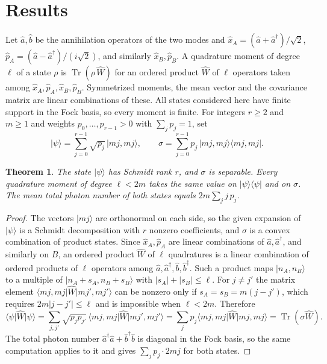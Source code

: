 \documentclass[11pt,a4paper]{article}
\newtheorem{theorem}{Theorem}
\theoremstyle{definition}
\theoremstyle{plain}
\DeclareMathOperator{\Tr}{Tr}
\newcommand{\ket}[1]{\lvert#1\rangle}
\newcommand{\bra}[1]{\langle#1\rvert}
\newcommand{\ketbra}[2]{\lvert#1\rangle\langle#2\rvert}
\begin{document}
\section{Results}\label{sec:results}
Let $\hat a,\hat b$ be the annihilation operators of the two modes and
$\hat x_A=(\hat a+\hat a^\dagger)/\sqrt2$,
$\hat p_A=(\hat a-\hat a^\dagger)/(i\sqrt2)$, and similarly $\hat x_B,\hat p_B$.
A quadrature moment of degree $\ell$ of a state $\rho$ is
$\Tr(\rho\,\hat W)$ for an ordered product $\hat W$ of $\ell$ operators taken
among $\hat x_A,\hat p_A,\hat x_B,\hat p_B$. Symmetrized moments, the mean
vector and the covariance matrix are linear combinations of these. All states
considered here have finite support in the Fock basis, so every moment is
finite. For integers $r\ge2$ and $m\ge1$ and weights $p_0,\dots,p_{r-1}>0$ with
$\sum_jp_j=1$, set
\[
\ket{\psi}=\sum_{j=0}^{r-1}\sqrt{p_j}\,\ket{mj,mj},
\qquad
\sigma=\sum_{j=0}^{r-1}p_j\,\ketbra{mj,mj}{mj,mj}.
\]

\begin{theorem}\label{thm:main}
The state $\ket\psi$ has Schmidt rank $r$, and $\sigma$ is separable. Every
quadrature moment of degree $\ell<2m$ takes the same value on $\ketbra\psi\psi$
and on $\sigma$. The mean total photon number of both states equals
$2m\sum_jj\,p_j$.
\end{theorem}

\begin{proof}
The vectors $\ket{mj}$ are orthonormal on each side, so the given expansion of
$\ket\psi$ is a Schmidt decomposition with $r$ nonzero coefficients, and
$\sigma$ is a convex combination of product states. Since
$\hat x_A,\hat p_A$ are linear combinations of $\hat a,\hat a^\dagger$, and
similarly on $B$, an ordered product $\hat W$ of $\ell$ quadratures is a linear
combination of ordered products of $\ell$ operators among
$\hat a,\hat a^\dagger,\hat b,\hat b^\dagger$. Such a product maps $\ket{n_A,n_B}$
to a multiple of $\ket{n_A+s_A,n_B+s_B}$ with $\lvert s_A\rvert+\lvert s_B\rvert\le\ell$.
For $j\ne j'$ the matrix element $\bra{mj,mj}\hat W\ket{mj',mj'}$ can be nonzero
only if $s_A=s_B=m(j-j')$, which requires $2m\lvert j-j'\rvert\le\ell$ and is
impossible when $\ell<2m$. Therefore
\[
\bra\psi\hat W\ket\psi=\sum_{j,j'}\sqrt{p_jp_{j'}}\,\bra{mj,mj}\hat W\ket{mj',mj'}
=\sum_jp_j\bra{mj,mj}\hat W\ket{mj,mj}=\Tr(\sigma\hat W).
\]
The total photon number $\hat a^\dagger\hat a+\hat b^\dagger\hat b$ is diagonal
in the Fock basis, so the same computation applies to it and gives
$\sum_jp_j\cdot2mj$ for both states.
\end{proof}
\end{document}
